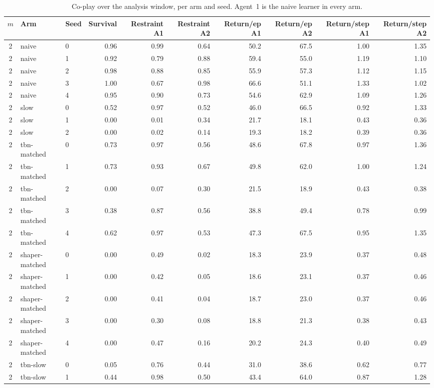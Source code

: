\begin{table}[ht]
\centering\small
\caption{Co-play over the analysis window, per arm and seed. Agent~1 is the naive learner in every arm.}
\label{tab:coplay}
\begin{tabular}{cllrrrrrrr}
\toprule
$m$ & Arm & Seed & Survival & Restraint A1 & Restraint A2 & Return/ep A1 & Return/ep A2 & Return/step A1 & Return/step A2 \\
\midrule
2 & naive & 0 & 0.96 & 0.99 & 0.64 & 50.2 & 67.5 & 1.00 & 1.35 \\
2 & naive & 1 & 0.92 & 0.79 & 0.88 & 59.4 & 55.0 & 1.19 & 1.10 \\
2 & naive & 2 & 0.98 & 0.88 & 0.85 & 55.9 & 57.3 & 1.12 & 1.15 \\
2 & naive & 3 & 1.00 & 0.67 & 0.98 & 66.6 & 51.1 & 1.33 & 1.02 \\
2 & naive & 4 & 0.95 & 0.90 & 0.73 & 54.6 & 62.9 & 1.09 & 1.26 \\
2 & slow & 0 & 0.52 & 0.97 & 0.52 & 46.0 & 66.5 & 0.92 & 1.33 \\
2 & slow & 1 & 0.00 & 0.01 & 0.34 & 21.7 & 18.1 & 0.43 & 0.36 \\
2 & slow & 2 & 0.00 & 0.02 & 0.14 & 19.3 & 18.2 & 0.39 & 0.36 \\
2 & tbn-matched & 0 & 0.73 & 0.97 & 0.56 & 48.6 & 67.8 & 0.97 & 1.36 \\
2 & tbn-matched & 1 & 0.73 & 0.93 & 0.67 & 49.8 & 62.0 & 1.00 & 1.24 \\
2 & tbn-matched & 2 & 0.00 & 0.07 & 0.30 & 21.5 & 18.9 & 0.43 & 0.38 \\
2 & tbn-matched & 3 & 0.38 & 0.87 & 0.56 & 38.8 & 49.4 & 0.78 & 0.99 \\
2 & tbn-matched & 4 & 0.62 & 0.97 & 0.53 & 47.3 & 67.5 & 0.95 & 1.35 \\
2 & shaper-matched & 0 & 0.00 & 0.49 & 0.02 & 18.3 & 23.9 & 0.37 & 0.48 \\
2 & shaper-matched & 1 & 0.00 & 0.42 & 0.05 & 18.6 & 23.1 & 0.37 & 0.46 \\
2 & shaper-matched & 2 & 0.00 & 0.41 & 0.04 & 18.7 & 23.0 & 0.37 & 0.46 \\
2 & shaper-matched & 3 & 0.00 & 0.30 & 0.08 & 18.8 & 21.3 & 0.38 & 0.43 \\
2 & shaper-matched & 4 & 0.00 & 0.47 & 0.16 & 20.2 & 24.3 & 0.40 & 0.49 \\
2 & tbn-slow & 0 & 0.05 & 0.76 & 0.44 & 31.0 & 38.6 & 0.62 & 0.77 \\
2 & tbn-slow & 1 & 0.44 & 0.98 & 0.50 & 43.4 & 64.0 & 0.87 & 1.28 \\

\end{tabular}
\end{table}
